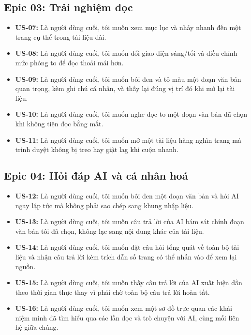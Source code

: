 \subsection{Epic 03: Trải nghiệm đọc}
\begin{itemize}
    \item \textbf{US-07:} Là người dùng cuối, tôi muốn xem mục lục và nhảy nhanh đến một trang cụ thể trong tài liệu dài.
    \item \textbf{US-08:} Là người dùng cuối, tôi muốn đổi giao diện sáng/tối và điều chỉnh mức phóng to để đọc thoải mái hơn.
    \item \textbf{US-09:} Là người dùng cuối, tôi muốn bôi đen và tô màu một đoạn văn bản quan trọng, kèm ghi chú cá nhân, và thấy lại đúng vị trí đó khi mở lại tài liệu.
    \item \textbf{US-10:} Là người dùng cuối, tôi muốn nghe đọc to một đoạn văn bản đã chọn khi không tiện đọc bằng mắt.
    \item \textbf{US-11:} Là người dùng cuối, tôi muốn mở một tài liệu hàng nghìn trang mà trình duyệt không bị treo hay giật lag khi cuộn nhanh.
\end{itemize}

\subsection{Epic 04: Hỏi đáp AI và cá nhân hoá}
\begin{itemize}
    \item \textbf{US-12:} Là người dùng cuối, tôi muốn bôi đen một đoạn văn bản và hỏi AI ngay lập tức mà không phải sao chép sang khung nhập liệu.
    \item \textbf{US-13:} Là người dùng cuối, tôi muốn câu trả lời của AI bám sát chính đoạn văn bản tôi đã chọn, không lạc sang nội dung khác của tài liệu.
    \item \textbf{US-14:} Là người dùng cuối, tôi muốn đặt câu hỏi tổng quát về toàn bộ tài liệu và nhận câu trả lời kèm trích dẫn số trang có thể nhấn vào để xem lại nguồn.
    \item \textbf{US-15:} Là người dùng cuối, tôi muốn thấy câu trả lời của AI xuất hiện dần theo thời gian thực thay vì phải chờ toàn bộ câu trả lời hoàn tất.
    \item \textbf{US-16:} Là người dùng cuối, tôi muốn xem một sơ đồ trực quan các khái niệm mình đã tìm hiểu qua các lần đọc và trò chuyện với AI, cùng mối liên hệ giữa chúng.
\end{itemize}

